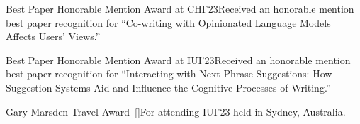 \begin{talks}

    \award
    {Best Paper Honorable Mention Award at CHI'23}{}{}{Received an honorable mention best paper recognition for ``Co-writing with Opinionated Language Models Affects Users' Views.''}

    \award
    {Best Paper Honorable Mention Award at IUI'23}{}{}{Received an honorable mention best paper recognition for ``Interacting with Next-Phrase Suggestions: How Suggestion Systems Aid and Influence the Cognitive Processes of Writing.''}

    \award
    {Gary Marsden Travel Award}{}{\normalfont ~[\href{https://sigchi.org/awards/gary-marsden-travel-awards/}{\small{\websiteSymbol}}]}{For attending IUI'23 held in Sydney, Australia.}


\end{talks}
\vspace{-3mm}

